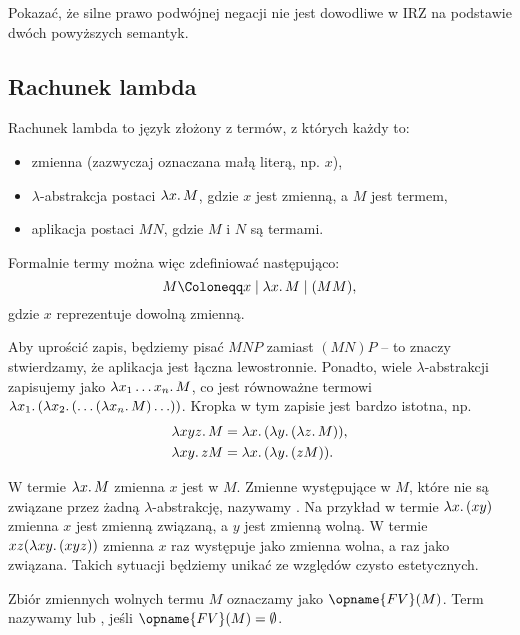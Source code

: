 \documentclass[polish,pretty]{angav}
\newcommand{\FV}{\opname{FV}}
\begin{document}
\begin{problem}
    Pokazać, że silne prawo podwójnej negacji nie jest dowodliwe w IRZ na podstawie dwóch powyższych semantyk.
\end{problem}

\subsection{Rachunek lambda}

Rachunek lambda to język złożony z termów, z których każdy to:
\begin{itemize}
    \item zmienna (zazwyczaj oznaczana małą literą, np. $x$),
    \item $\lambda$-abstrakcja postaci $\lambda x\ldotp M$, gdzie $x$ jest zmienną, a $M$ jest termem,
    \item aplikacja postaci $MN$, gdzie $M$ i $N$ są termami.
\end{itemize}

Formalnie termy można więc zdefiniować następująco:
\[ M \Coloneqq x \mid \lambda x\ldotp M \mid (MM), \]
gdzie $x$ reprezentuje dowolną zmienną.

Aby uprościć zapis, będziemy pisać $MNP$ zamiast $(MN)P$ -- to znaczy stwierdzamy, że aplikacja jest łączna lewostronnie. Ponadto, wiele $\lambda$-abstrakcji zapisujemy jako $\lambda x_1 \ldots x_n\ldotp M$, co jest równoważne termowi $\lambda x_1\ldotp (\lambda x_2\ldotp (\ldots (\lambda x_n\ldotp M) \ldots))$. Kropka w tym zapisie jest bardzo istotna, np.
\begin{align*}
    \lambda xyz\ldotp M &= \lambda x\ldotp (\lambda y\ldotp (\lambda z\ldotp M)), \\
    \lambda xy\ldotp z M &= \lambda x\ldotp (\lambda y\ldotp (z M)).
\end{align*}

W termie $\lambda x\ldotp M$ zmienna $x$ jest  w $M$.
Zmienne występujące w $M$, które nie są związane przez żadną $\lambda$-abstrakcję, nazywamy .
Na przykład w termie $\lambda x\ldotp (x y)$ zmienna $x$ jest zmienną związaną, a $y$ jest zmienną wolną.
W termie $xz(\lambda xy\ldotp (xyz))$ zmienna $x$ raz występuje jako zmienna wolna, a raz jako związana. Takich sytuacji będziemy unikać ze względów czysto estetycznych.

Zbiór zmiennych wolnych termu $M$ oznaczamy jako $\FV(M)$.
Term nazywamy  lub , jeśli $\FV(M) = \emptyset$.
\end{document}
